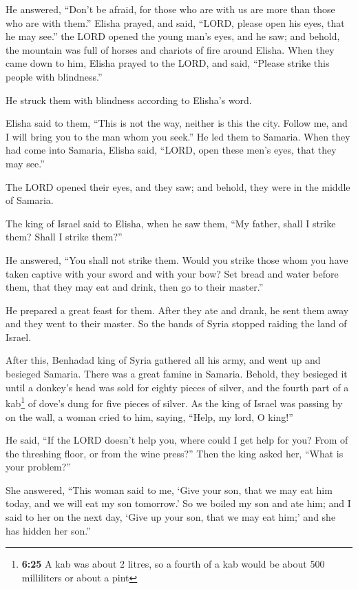  He answered, ``Don't be afraid, for those who are with
us are more than those who are with them.''  Elisha
prayed, and said, ``LORD, please open his eyes, that he may see.'' the
LORD opened the young man's eyes, and he saw; and behold, the mountain
was full of horses and chariots of fire around Elisha. 
When they came down to him, Elisha prayed to the LORD, and said,
``Please strike this people with blindness.''

He struck them with blindness according to Elisha's word.

 Elisha said to them, ``This is not the way, neither is
this the city. Follow me, and I will bring you to the man whom you
seek.'' He led them to Samaria.  When they had come into
Samaria, Elisha said, ``LORD, open these men's eyes, that they may
see.''

The LORD opened their eyes, and they saw; and behold, they were in the
middle of Samaria.

 The king of Israel said to Elisha, when he saw them,
``My father, shall I strike them? Shall I strike them?''

 He answered, ``You shall not strike them. Would you
strike those whom you have taken captive with your sword and with your
bow? Set bread and water before them, that they may eat and drink, then
go to their master.''

 He prepared a great feast for them. After they ate and
drank, he sent them away and they went to their master. So the bands of
Syria stopped raiding the land of Israel.

 After this, Benhadad king of Syria gathered all his
army, and went up and besieged Samaria.  There was a
great famine in Samaria. Behold, they besieged it until a donkey's head
was sold for eighty pieces of silver, and the fourth part of a
kab\footnote{\textbf{6:25} A kab was about 2 litres, so a fourth of a
  kab would be about 500 milliliters or about a pint} of dove's dung for
five pieces of silver.  As the king of Israel was passing
by on the wall, a woman cried to him, saying, ``Help, my lord, O king!''

 He said, ``If the LORD doesn't help you, where could I
get help for you? From of the threshing floor, or from the wine press?''
 Then the king asked her, ``What is your problem?''

She answered, ``This woman said to me, `Give your son, that we may eat
him today, and we will eat my son tomorrow.'  So we
boiled my son and ate him; and I said to her on the next day, `Give up
your son, that we may eat him;' and she has hidden her son.''

